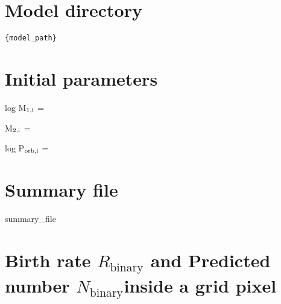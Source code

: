 \documentclass{article}
\begin{document}
\section*{\huge Model directory}
\begin{verbatim}
{model_path}
\end{verbatim}

\begin{minipage}{0.5\linewidth}
\section*{\Huge Initial parameters}

log M$_{\rm 1,i}$ = %

M$_{\rm 2,i}$ = %

log P$_{\rm orb,i}$ = %

\end{minipage}
\begin{minipage}{0.5\linewidth}


\section*{\Huge  Summary file}

{summary_file}

\end{minipage}

\section*{\huge Birth rate $R_\mathrm{binary}$ and Predicted number $N_\mathrm{binary}$\newline inside a grid pixel}
\end{document}
